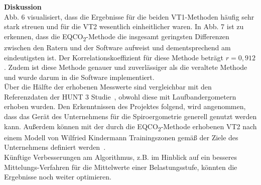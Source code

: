 \textbf{\Large Diskussion}\\

Abb. 6 visualisiert, dass die Ergebnisse für die beiden VT1-Methoden häufig sehr stark streuen und für die VT2 wesentlich einheitlicher waren. In Abb. 7 ist zu erkennen, dass die EQCO\textsubscript{2}-Methode die insgesamt geringsten Differenzen zwischen den Ratern und der Software aufweist und dementsprechend am eindeutigsten ist. Der Korrelationskoeffizient für diese Methode beträgt $r = 0,912$. Zudem ist diese Methode genauer und zuverlässiger als die veraltete Methode und wurde darum in die Software implementiert.\\
Über die Hälfte der erhobenen Messwerte sind vergleichbar mit den Referenzdaten der HUNT 3 Studie~\cite{Loe.2014}, obwohl diese mit Laufbandergometern erhoben wurden. Den Erkenntnissen des Projektes folgend, wird angenommen, dass das Gerät des Unternehmens für die Spiroergometrie generell genutzt werden kann. Außerdem können mit der durch die EQCO\textsubscript{2}-Methode erhobenen VT2 nach einem Modell von Wilfried Kindermann Trainingszonen gemäß der Ziele des Unternehmens definiert werden~\cite{Kindermann.2004}.\\
Künftige Verbesserungen am Algorithmus, z.B. im Hinblick auf ein besseres Mittelungs-Verfahren für die Mittelwerte einer Belastungsstufe, könnten die Ergebnisse noch weiter optimieren.
